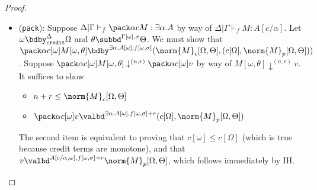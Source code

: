 \boundingex*
\begin{proof}
$\;$
\begin{itemize}
  \item (\texttt{pack}): Suppose $\Delta | \Gamma \vdash_f \pack \alpha c M : \exists \alpha. A$ by way of $\Delta | \Gamma \vdash_f M : A[c/\alpha]$. Let $\omega \bdby_{\texttt{credit}}^\Delta \Omega$ and $\theta \subbd^{\Gamma[\omega],\sigma} \Theta$. We must show that $\pack \alpha {c[\omega]} {M[\omega,\theta]} \bdby^{\exists \alpha.A[\omega],f[\omega,\sigma]} (\norm{M}_c[\Omega,\Theta],(c[\Omega],\norm{M}_p[\Omega,\Theta]))$. Suppose $\pack \alpha {c[\omega]} {M[\omega,\theta]} \downarrow^{(n,r)} \pack \alpha {c[\omega]} v$ by way of $M[\omega,\theta] \downarrow^{(n,r)} v$. It suffices to show
  \begin{itemize}
    \item $n + r \leq \norm{M}_c[\Omega,\Theta]$
    \item $\pack \alpha {c[\omega]} v \valbd^{\exists \alpha.A[\omega],f[\omega,\sigma] + r} (c[\Omega],\norm{M}_p[\Omega,\Theta])$
  \end{itemize}
  The second item is equivalent to proving that $c[\omega] \leq c[\Omega]$ (which is true because credit terms are monotone), and that $v \valbd^{A[c/\alpha,\omega],f[\omega,\sigma] + r} \norm{M}_p[\Omega,\Theta]$, which follows immediately by IH.
  

\end{itemize}
\end{proof}
